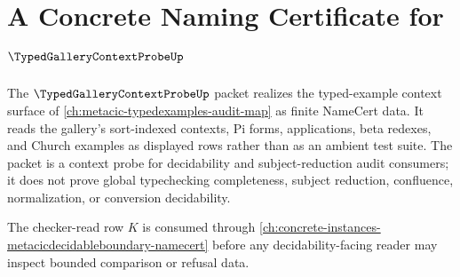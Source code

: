 \chapter{A Concrete Naming Certificate for $\TypedGalleryContextProbeUp$}
\label{ch:concrete-instances-typed-gallery-context-probe-namecert}

The $\TypedGalleryContextProbeUp$ packet realizes the typed-example context surface of \autoref{ch:metacic-typedexamples-audit-map} as finite NameCert data. It reads the gallery's sort-indexed contexts, Pi forms, applications, beta redexes, and Church examples as displayed rows rather than as an ambient test suite. The packet is a context probe for decidability and subject-reduction audit consumers; it does not prove global typechecking completeness, subject reduction, confluence, normalization, or conversion decidability.

The checker-read row $K$ is consumed through \autoref{ch:concrete-instances-metacicdecidableboundary-namecert} before any decidability-facing reader may inspect bounded comparison or refusal data.

